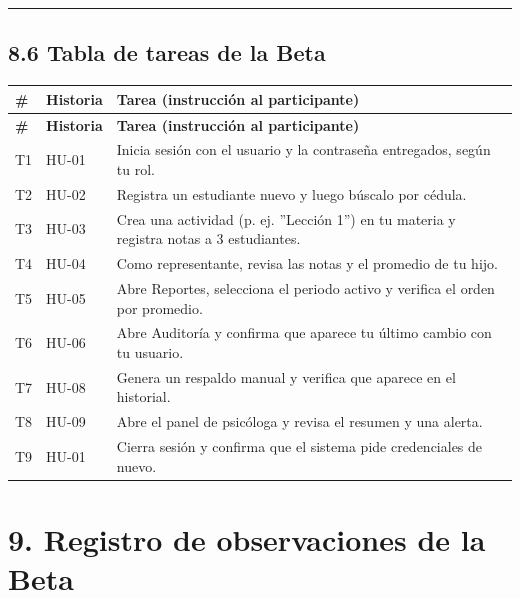 \documentclass[11pt,a4paper]{article}
\begin{document}
\hrule\vspace{0.4em}


\subsection*{8.6 Tabla de tareas de la Beta}


{\small
\begin{longtable}{|p{}|p{}|p{}|}
\rowcolor{UTECblue}\color{white}\bfseries \# & \color{white}\bfseries Historia & \color{white}\bfseries Tarea (instrucción al participante) \\ \hline
\endfirsthead
\rowcolor{UTECblue}\color{white}\bfseries \# & \color{white}\bfseries Historia & \color{white}\bfseries Tarea (instrucción al participante) \\ \hline
\endhead
T1 & HU-01 & Inicia sesión con el usuario y la contraseña entregados, según tu rol. \\ \hline
T2 & HU-02 & Registra un estudiante nuevo y luego búscalo por cédula. \\ \hline
T3 & HU-03 & Crea una actividad (p. ej. ''Lección 1'') en tu materia y registra notas a 3 estudiantes. \\ \hline
T4 & HU-04 & Como representante, revisa las notas y el promedio de tu hijo. \\ \hline
T5 & HU-05 & Abre Reportes, selecciona el periodo activo y verifica el orden por promedio. \\ \hline
T6 & HU-06 & Abre Auditoría y confirma que aparece tu último cambio con tu usuario. \\ \hline
T7 & HU-08 & Genera un respaldo manual y verifica que aparece en el historial. \\ \hline
T8 & HU-09 & Abre el panel de psicóloga y revisa el resumen y una alerta. \\ \hline
T9 & HU-01 & Cierra sesión y confirma que el sistema pide credenciales de nuevo. \\ \hline
\end{longtable}}


\section*{9. Registro de observaciones de la Beta}
\end{document}
